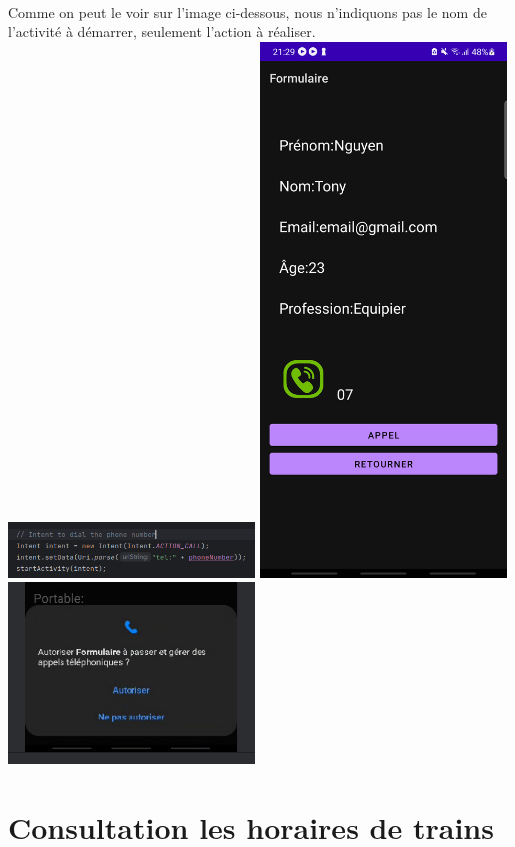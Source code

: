 \documentclass[a4paper]{article}
\begin{document}
\begin{multicols}{2}
      \paragraph{}
        Comme on peut le voir sur l'image ci-dessous, nous n'indiquons pas le nom de l'activité à démarrer, seulement l'action à réaliser.
      \includegraphics[width=0.49\textwidth]{implicit/implementation}
      \includegraphics[width=0.49\textwidth]{explicit/screenshotFormulaireAffichage}
      \includegraphics[width=0.49\textwidth]{implicit/appel}
  \section{Consultation les horaires de trains}

\end{multicols}
\end{document}
